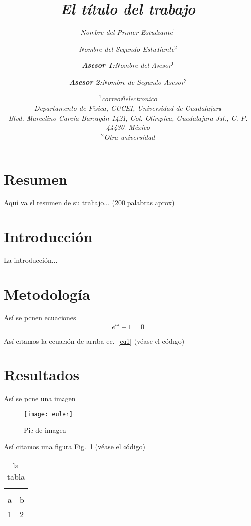 \documentclass[letterpaper,12pt]{article}
\title{\fontsize{0.5cm}{0.5cm}\selectfont
\textit{\textbf{El título del trabajo}} %
}
\author{ \fontsize{0.35cm}{0.5cm}\selectfont
\textit{ Nombre del Primer Estudiante$^1$} \\
       \and  \fontsize{0.35cm}{0.5cm}\selectfont \textit{Nombre del Segundo Estudiante$^2$} \\
        \and \fontsize{0.35cm}{0.5cm}\selectfont \textit{\textbf{Asesor 1:}Nombre del Asesor$^1$} %
        \and \fontsize{0.35cm}{0.5cm}\selectfont \textit{\textbf{Asesor 2:}Nombre de Segundo Asesor$^2$} \\
	}
\date{\small
  $^1$\fontsize{0.35cm}{0.5cm}\selectfont \textit{correo@electronico\\ Departamento de Física, CUCEI, Universidad de Guadalajara\\
    Blvd. Marcelino García Barragán 1421, Col. Olímpica, Guadalajara Jal., C. P. 44430, México\\
    $^2$Otra universidad}\\[2ex]
  }
\begin{document}
\maketitle
\thispagestyle{fancy}

\section*{Resumen}
Aquí va el resumen de su trabajo... (200 palabras aprox)

\section*{Introducción}
La introducción...


\section*{Metodología}

Así se ponen ecuaciones
\begin{equation}
  e^{i\pi} + 1 = 0
  \label{eq1}
\end{equation}

Así citamos la ecuación de arriba ec.~\ref{eq1} (véase el código)

\section*{Resultados}

Así se pone una imagen
\begin{figure}[H]
   \centering
   \texttt{[image: euler]}
   \caption{Pie de imagen}
   \label{fig:imagen1} %
\end{figure}

Así citamos una figura  Fig.~\ref{fig:imagen1} (véase el código)


\begin{table}[H] %
    \begin{center}
	    \begin{tabular}{|l|l|}
	    	\hline
	    	\multicolumn{2}{|c|}{\text{Title}} \\
	        \hline \hline 
	        a & b \\ 
	        \hline 
	        1 & 2 \\ 
	        \hline 
        \end{tabular} 
    \end{center}
	\label{tab1}
	\caption{la tabla}
\end{table}
\end{document}
